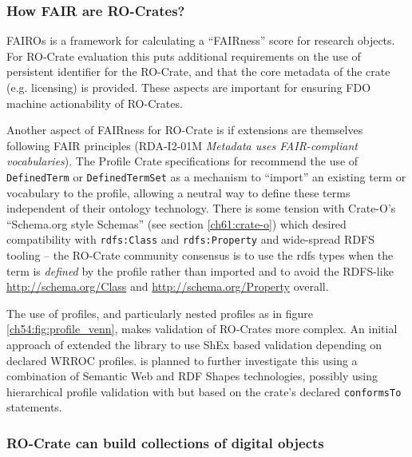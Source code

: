 \subsubsection{How FAIR are RO-Crates?}
\label{ch61:fair-crates}

FAIROs \cite{González 2022} is a framework for calculating a ``FAIRness'' score for research objects. For RO-Crate evaluation this puts additional requirements on the use of persistent identifier for the RO-Crate, and that the core metadata of the crate (e.g. licensing) is provided. These aspects are important for ensuring FDO machine actionability of RO-Crates.

Another aspect of FAIRness for RO-Crate is if extensions are themselves following FAIR principles (RDA-I2-01M \emph{Metadata uses FAIR-compliant vocabularies}).  The Profile Crate specifications for  recommend the use of \texttt{DefinedTerm} or \texttt{DefinedTermSet} as a mechanism to ``import'' an existing term or vocabulary to the profile, allowing a neutral way to define these terms independent of their ontology technology. There is some tension with Crate-O's   ``Schema.org style Schemas'' (see section \vref{ch61:crate-o}) which desired compatibility with \texttt{rdfs:Class} and \texttt{rdfs:Property} and wide-spread RDFS tooling -- the RO-Crate community consensus is to use the rdfs types when the term is \emph{defined} by the profile rather than imported and to avoid the RDFS-like \url{http://schema.org/Class} and \url{http://schema.org/Property} overall.

The use of profiles, and particularly nested profiles as in figure \vref{ch54:fig:profile_venn}, makes validation of RO-Crates more complex. An initial approach of  extended the  library to use ShEx based validation \cite{Baker 2019} depending on declared WRROC profiles.
 is planned to further investigate this using a combination of Semantic Web and RDF Shapes technologies, possibly using hierarchical profile validation with  but based on the crate's declared \texttt{conformsTo} statements.


\subsubsection{RO-Crate can build collections of digital objects}
\label{ch61:collections}

